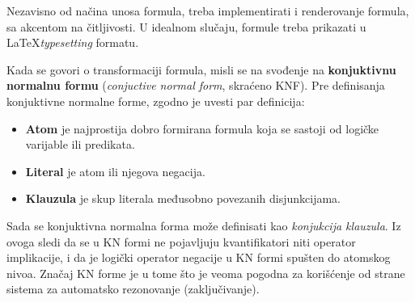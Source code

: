 Nezavisno od načina unosa formula, treba implementirati i renderovanje formula, sa akcentom na čitljivosti. U idealnom slučaju, formule treba prikazati u \LaTeX \space \textit{typesetting} formatu.

Kada se govori o transformaciji formula, misli se na svođenje na \textbf{konjuktivnu normalnu formu} (\textit{conjuctive normal form}, skraćeno KNF). Pre definisanja konjuktivne normalne forme, zgodno je uvesti par definicija:
\begin{itemize}
\item \textbf{Atom} je najprostija dobro formirana formula koja se sastoji od logičke varijable ili predikata.
\item \textbf{Literal} je atom ili njegova negacija.
\item \textbf{Klauzula} je skup literala međusobno povezanih disjunkcijama.
\end{itemize}
Sada se konjuktivna normalna forma može definisati kao \emph{konjukcija klauzula}. Iz ovoga sledi da se u KN formi ne pojavljuju kvantifikatori niti operator implikacije, i da je logički operator negacije u KN formi spušten do atomskog nivoa. Značaj KN forme je u tome što je veoma pogodna za korišćenje od strane sistema za automatsko rezonovanje (zaključivanje).

